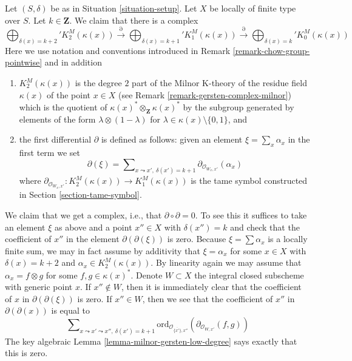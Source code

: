 \begin{remark}
\label{remark-higher-chow-pointwise}
Let $(S, \delta)$ be as in Situation \ref{situation-setup}.
Let $X$ be locally of finite type over $S$. Let $k \in \mathbf{Z}$.
We claim that there is a complex
$$
\bigoplus\nolimits_{\delta(x) = k + 2}' K_2^M(\kappa(x))
\xrightarrow{\partial}
\bigoplus\nolimits_{\delta(x) = k + 1}' K_1^M(\kappa(x))
\xrightarrow{\partial}
\bigoplus\nolimits_{\delta(x) = k}' K_0^M(\kappa(x))
$$
Here we use notation and conventions introduced in
Remark \ref{remark-chow-group-pointwise} and in addition
\begin{enumerate}
\item $K_2^M(\kappa(x))$ is the degree $2$ part of
the Milnor K-theory of the residue field $\kappa(x)$ of the point
$x \in X$ (see Remark \ref{remark-gersten-complex-milnor}) which
is the quotient of $\kappa(x)^* \otimes_\mathbf{Z} \kappa(x)^*$
by the subgroup generated by elements of the form
$\lambda \otimes (1 - \lambda)$ for
$\lambda \in \kappa(x) \setminus \{0, 1\}$, and
\item the first differential $\partial$ is defined as follows:
given an element $\xi = \sum_x \alpha_x$ in the first term
we set
$$
\partial(\xi) = \sum\nolimits_{x \leadsto x',\ \delta(x') = k + 1}
\partial_{\mathcal{O}_{W_x, x'}}(\alpha_x)
$$
where
$\partial_{\mathcal{O}_{W_x, x'}} : K_2^M(\kappa(x)) \to K_1^M(\kappa(x))$
is the tame symbol constructed in Section \ref{section-tame-symbol}.
\end{enumerate}
We claim that we get a complex, i.e., that $\partial \circ \partial = 0$.
To see this it suffices to take an element $\xi$ as above and a point
$x'' \in X$ with $\delta(x'') = k$ and check that the coefficient of
$x''$ in the element $\partial(\partial(\xi))$ is zero.
Because $\xi = \sum \alpha_x$ is a locally finite sum, we
may in fact assume by additivity that $\xi = \alpha_x$ for
some $x \in X$ with $\delta(x) = k + 2$ and $\alpha_x \in K_2^M(\kappa(x))$.
By linearity again we may assume that $\alpha_x = f \otimes g$ for
some $f, g \in \kappa(x)^*$. Denote $W \subset X$ the integral closed
subscheme with generic point $x$. If $x'' \not \in W$, then it is
immediately clear that the coefficient of $x$ in $\partial(\partial(\xi))$
is zero. If $x'' \in W$, then we see that the coefficient of $x''$
in $\partial(\partial(x))$ is equal to
$$
\sum\nolimits_{x \leadsto x' \leadsto x'',\ \delta(x') = k + 1}
\text{ord}_{\mathcal{O}_{\overline{\{x'\}}, x''}}(
\partial_{\mathcal{O}_{W, x'}}(f, g))
$$
The key algebraic Lemma \ref{lemma-milnor-gersten-low-degree}
says exactly that this is zero.
\end{remark}

